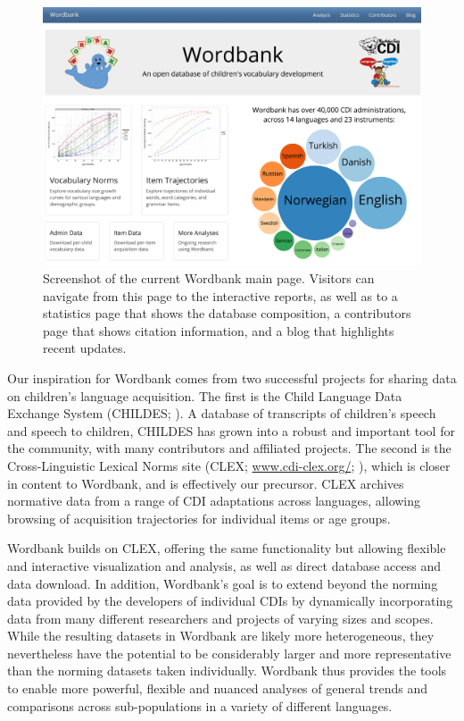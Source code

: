 \documentclass[doc,noapacite]{apa2}
\begin{document}
\begin{figure}[h!]
\includegraphics[width=6.4in]{figures/screenshot.png}
\caption{\label{fig:screenshot} Screenshot of the current Wordbank main page. Visitors can navigate from this page to the interactive reports, as well as to a statistics page that shows the database composition, a contributors page that shows citation information, and a blog that highlights recent updates.}
\end{figure}

Our inspiration for Wordbank comes from two successful projects for sharing data on children's language acquisition. The first is the Child Language Data Exchange System (CHILDES; ). A database of transcripts of children's speech and speech to children, CHILDES has grown into a robust and important tool for the community, with many contributors and affiliated projects. The second is the Cross-Linguistic Lexical Norms site (CLEX; \url{www.cdi-clex.org/}; ), which is closer in content to Wordbank, and is effectively our precursor. CLEX archives normative data from a range of CDI adaptations across languages, allowing browsing of acquisition trajectories for individual items or age groups. 

Wordbank builds on CLEX, offering the same functionality but allowing flexible and interactive visualization and analysis, as well as direct database access and data download. In addition, Wordbank's goal is to extend beyond the norming data provided by the developers of individual CDIs by dynamically incorporating data from many different researchers and projects of varying sizes and scopes.  While the resulting datasets in Wordbank are likely more heterogeneous, they nevertheless have the potential to be considerably larger and more representative than the norming datasets taken individually.  Wordbank thus provides the tools to enable more powerful, flexible and nuanced analyses of general trends and comparisons across sub-populations in a variety of different languages.
\end{document}
